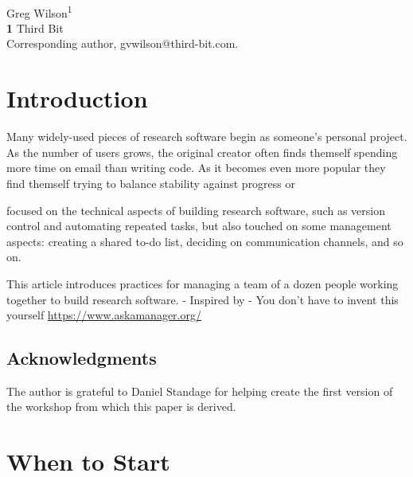 \documentclass[10pt,letterpaper]{article}
\begin{document}
\vspace*{0.2in}

\begin{flushleft}
{\Large
\textbf{}
}
\newline
\\
{Greg Wilson}\textsuperscript{1{\ddag}}
\\
\bigskip
\textbf{1} Third Bit\\
{\ddag} Corresponding author, gvwilson@third-bit.com.
\end{flushleft}

\section*{Introduction}

Many widely-used pieces of research software begin as someone's personal project.
As the number of users grows,
the original creator often finds themself spending more time on email than writing code.
As it becomes even more popular
they find themself trying to balance stability against progress
or 

\cite{Wilson2014,Wilson2017,Irving2021} focused on the technical aspects of building research software,
such as version control and automating repeated tasks,
but also touched on some management aspects:
creating a shared to-do list,
deciding on communication channels,
and so on.

This article introduces practices for managing a team of a dozen people working together to build research software.
  - Inspired by \cite{Barker2010,ODuinn2021}
- You don't have to invent this yourself \url{https://www.askamanager.org/}

\subsection*{Acknowledgments}

The author is grateful to Daniel Standage for helping create
the first version of the workshop from which this paper is derived.

\section{When to Start}
\end{document}
